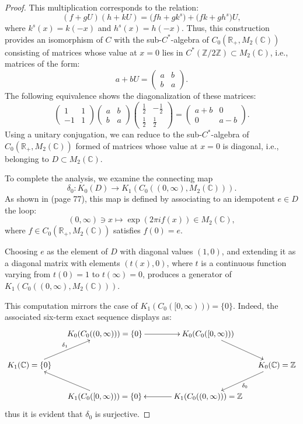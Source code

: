 \documentclass[letterpaper,11pt]{article}
\theoremstyle{plain}
\begin{document}
\begin{proof}
This multiplication corresponds to the relation:  
\[
(f + gU)(h + kU) = \big(fh + gk^s\big) + \big(fk + gh^s\big)U,  
\]
where $ k^s(x) = k(-x) $ and $ h^s(x) = h(-x) $. Thus, this construction provides an isomorphism of $ C $ with the sub-$ C^* $-algebra of $ C_0(\mathbb{R}_+, M_2(\mathbb{C})) $ consisting of matrices whose value at $ x = 0 $ lies in $ C^*(\mathbb{Z}/2\mathbb{Z}) \subset M_2(\mathbb{C}) $, i.e., matrices of the form:  
\[
a + bU = 
\begin{pmatrix}
a & b \\
b & a
\end{pmatrix}.
\]
The following equivalence shows the diagonalization of these matrices:  
\[
\begin{pmatrix}
1 & 1 \\
-1 & 1
\end{pmatrix}
\begin{pmatrix}
a & b \\
b & a
\end{pmatrix}
\begin{pmatrix}
\frac{1}{2} & -\frac{1}{2} \\
\frac{1}{2} & \frac{1}{2}
\end{pmatrix}
=
\begin{pmatrix}
a + b & 0 \\
0 & a - b
\end{pmatrix}.
\]
Using a unitary conjugation, we can reduce to the sub-$ C^* $-algebra of $ C_0(\mathbb{R}_+, M_2(\mathbb{C})) $ formed of matrices whose value at $ x = 0 $ is diagonal, i.e., belonging to $ D \subset M_2(\mathbb{C}) $.  

To complete the analysis, we examine the connecting map  
\[
\delta_0: K_0(D) \to K_1(C_0((0, \infty), M_2(\mathbb{C}))).
\]
As shown in \cite{Bl} (page 77), this map is defined by associating to an idempotent $ e \in D $ the loop:  
\[
(0, \infty) \ni x \mapsto \exp(2\pi i f(x)) \in M_2(\mathbb{C}),
\]
where $ f \in C_0(\mathbb{R}_+, M_2(\mathbb{C})) $ satisfies $ f(0) = e $.  

Choosing $ e $ as the element of $ D $ with diagonal values $ (1, 0) $, and extending it as a diagonal matrix with elements $ (t(x), 0) $, where $ t $ is a continuous function varying from $ t(0) = 1 $ to $ t(\infty) = 0 $, produces a generator of $ K_1(C_0((0, \infty), M_2(\mathbb{C}))) $.  

This computation mirrors the case of $ K_1(C_0([0, \infty))) = \{0\} $. Indeed,  the associated six-term exact sequence displays as:  
\[
\begin{gathered}
\xymatrix@C-1em{
& K_0(C_0((0,\infty))) = \{0\} \ar[rr] && K_0(C_0([0,\infty))) \ar[dr] \\
K_1(\mathbb{C}) = \{0\} \ar[ur]^{\delta_1} &&&& K_0(\mathbb{C}) = \mathbb{Z} \ar[dl]^{\delta_0} \\
& K_1(C_0([0,\infty))) = \{0\} \ar[ul] && K_1(C_0((0,\infty))) = \mathbb{Z} \ar[ll]
}
\end{gathered}
\]
thus it is evident that $ \delta_0 $ is surjective.
\end{proof}
\end{document}
